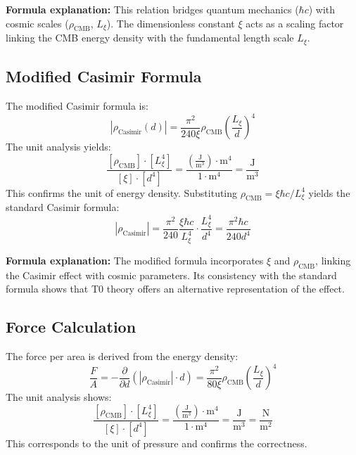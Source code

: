 	\textbf{Formula explanation:} This relation bridges quantum mechanics ($\hbar c$) with cosmic scales ($\rho_{\text{CMB}}$, $L_\xi$). The dimensionless constant $\xi$ acts as a scaling factor linking the CMB energy density with the fundamental length scale $L_\xi$.
	
	\subsection{Modified Casimir Formula}
	The modified Casimir formula is:
	\begin{equation}
		|\rho_{\text{Casimir}}(d)| = \frac{\pi^2}{240 \xi} \rho_{\text{CMB}} \left( \frac{L_\xi}{d} \right)^4
	\end{equation}
	The unit analysis yields:
	\begin{equation}
		\frac{[\rho_{\text{CMB}}] \cdot [L_\xi^4]}{[\xi] \cdot [d^4]} = \frac{\left( \frac{\text{J}}{\text{m}^3} \right) \cdot \text{m}^4}{1 \cdot \text{m}^4} = \frac{\text{J}}{\text{m}^3}
	\end{equation}
	This confirms the unit of energy density. Substituting $\rho_{\text{CMB}} = \xi \hbar c / L_\xi^4$ yields the standard Casimir formula:
	\begin{equation}
		|\rho_{\text{Casimir}}| = \frac{\pi^2}{240} \frac{\xi \hbar c}{L_\xi^4} \cdot \frac{L_\xi^4}{d^4} = \frac{\pi^2 \hbar c}{240 d^4}
	\end{equation}
	
	\textbf{Formula explanation:} The modified formula incorporates $\xi$ and $\rho_{\text{CMB}}$, linking the Casimir effect with cosmic parameters. Its consistency with the standard formula shows that T0 theory offers an alternative representation of the effect.
	
	\subsection{Force Calculation}
	The force per area is derived from the energy density:
	\begin{equation}
		\frac{F}{A} = -\frac{\partial}{\partial d} \left( |\rho_{\text{Casimir}}| \cdot d \right) = \frac{\pi^2}{80 \xi} \rho_{\text{CMB}} \left( \frac{L_\xi}{d} \right)^4
	\end{equation}
	The unit analysis shows:
	\begin{equation}
		\frac{[\rho_{\text{CMB}}] \cdot [L_\xi^4]}{[\xi] \cdot [d^4]} = \frac{\left( \frac{\text{J}}{\text{m}^3} \right) \cdot \text{m}^4}{1 \cdot \text{m}^4} = \frac{\text{J}}{\text{m}^3} = \frac{\text{N}}{\text{m}^2}
	\end{equation}
	This corresponds to the unit of pressure and confirms the correctness.
	
